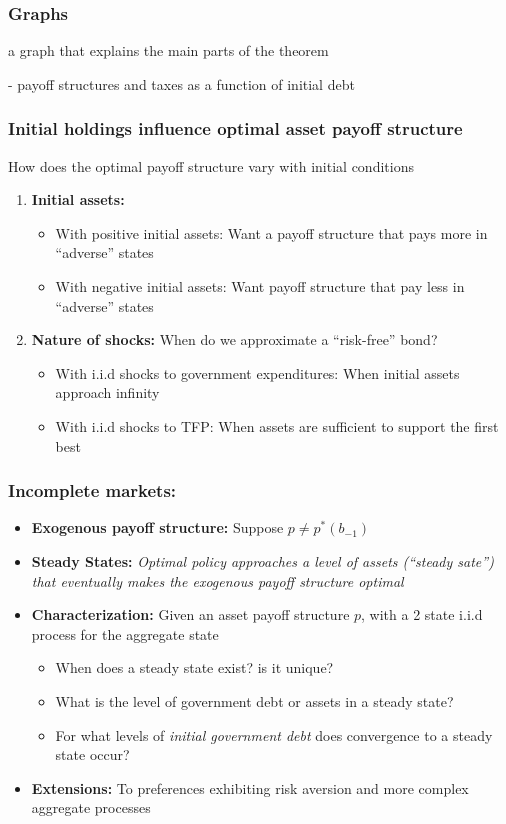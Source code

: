 \documentclass{beamer}
\begin{document}
  \begin{frame}
   \frametitle{Graphs }
    a graph that explains the main parts of the theorem

   - payoff structures and taxes as a function of initial debt
  \end{frame}

  \begin{frame}
   \frametitle{Initial holdings influence optimal asset payoff structure}
How does the optimal payoff structure vary with initial conditions
\begin{enumerate}
\item \textbf{Initial assets: }
\begin{itemize}

 \item With positive initial assets: Want a payoff structure that pays more in ``adverse'' states
 \item With negative initial assets: Want payoff structure that pay less in ``adverse'' states
\end{itemize}

 \item \textbf{Nature of shocks: } When do we approximate a ``risk-free'' bond?
 \begin{itemize}
  \item With i.i.d shocks to government expenditures: When initial assets approach  infinity
  \item With i.i.d  shocks to  TFP: When assets are sufficient to support the first best
 \end{itemize}

\end{enumerate}



  \end{frame}


\begin{frame}
	\frametitle{Incomplete markets:}
	\begin{itemize}
		\item  \textbf{Exogenous payoff structure:} Suppose $p\neq p^*(b_{-1})$
		\item \textbf{Steady States: }\emph{Optimal policy approaches a level of assets (``steady
		sate'') that eventually  makes the exogenous payoff structure optimal}
		
		\item \textbf{Characterization: } Given an asset payoff structure $p$, with  a 2 state i.i.d process for the aggregate state
		\begin{itemize}
			\item When does a steady state exist? is it unique?
			\item What is the level of government debt or   assets in a steady state?
			\item For what levels of  \emph{initial government debt} does  convergence to a steady state occur?
 			\end{itemize}
		\item  \textbf{Extensions: } To preferences exhibiting risk aversion and more complex aggregate processes
	\end{itemize}
\end{frame}
\end{document}
